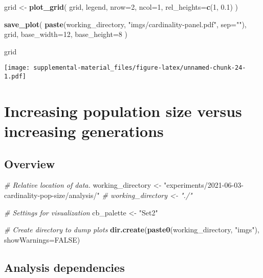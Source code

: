 \documentclass[]{book}
\newenvironment{Shaded}{\begin{snugshade}}{\end{snugshade}}
\newcommand{\CommentTok}[1]{\textcolor[rgb]{0.56,0.35,0.01}{\textit{#1}}}
\newcommand{\DataTypeTok}[1]{\textcolor[rgb]{0.13,0.29,0.53}{#1}}
\newcommand{\DecValTok}[1]{\textcolor[rgb]{0.00,0.00,0.81}{#1}}
\newcommand{\FloatTok}[1]{\textcolor[rgb]{0.00,0.00,0.81}{#1}}
\newcommand{\KeywordTok}[1]{\textcolor[rgb]{0.13,0.29,0.53}{\textbf{#1}}}
\newcommand{\NormalTok}[1]{#1}
\newcommand{\OtherTok}[1]{\textcolor[rgb]{0.56,0.35,0.01}{#1}}
\newcommand{\StringTok}[1]{\textcolor[rgb]{0.31,0.60,0.02}{#1}}
\begin{document}
\begin{Shaded}
\begin{Highlighting}[]
\NormalTok{grid <-}\StringTok{ }\KeywordTok{plot_grid}\NormalTok{(}
\NormalTok{  grid,}
\NormalTok{  legend,}
  \DataTypeTok{nrow=}\DecValTok{2}\NormalTok{,}
  \DataTypeTok{ncol=}\DecValTok{1}\NormalTok{,}
  \DataTypeTok{rel_heights=}\KeywordTok{c}\NormalTok{(}\DecValTok{1}\NormalTok{, }\FloatTok{0.1}\NormalTok{)}
\NormalTok{)}

\KeywordTok{save_plot}\NormalTok{(}
  \KeywordTok{paste}\NormalTok{(working_directory, }\StringTok{"imgs/cardinality-panel.pdf"}\NormalTok{, }\DataTypeTok{sep=}\StringTok{""}\NormalTok{),}
\NormalTok{  grid,}
  \DataTypeTok{base_width=}\DecValTok{12}\NormalTok{,}
  \DataTypeTok{base_height=}\DecValTok{8}
\NormalTok{)}

\NormalTok{grid}
\end{Highlighting}
\end{Shaded}

\texttt{[image: supplemental-material\_files/figure-latex/unnamed-chunk-24-1.pdf]}

\hypertarget{increasing-population-size-versus-increasing-generations}{%
\chapter{Increasing population size versus increasing generations}\label{increasing-population-size-versus-increasing-generations}}

\hypertarget{overview-2}{%
\section{Overview}\label{overview-2}}

\begin{Shaded}
\begin{Highlighting}[]
\CommentTok{# Relative location of data.}
\NormalTok{working_directory <-}
\StringTok{  "experiments/2021-06-03-cardinality-pop-size/analysis/"}
\CommentTok{# working_directory <- "./"}

\CommentTok{# Settings for visualization}
\NormalTok{cb_palette <-}\StringTok{ "Set2"}

\CommentTok{# Create directory to dump plots}
\KeywordTok{dir.create}\NormalTok{(}\KeywordTok{paste0}\NormalTok{(working_directory, }\StringTok{"imgs"}\NormalTok{), }\DataTypeTok{showWarnings=}\OtherTok{FALSE}\NormalTok{)}
\end{Highlighting}
\end{Shaded}

\hypertarget{analysis-dependencies-2}{%
\section{Analysis dependencies}\label{analysis-dependencies-2}}
\end{document}
